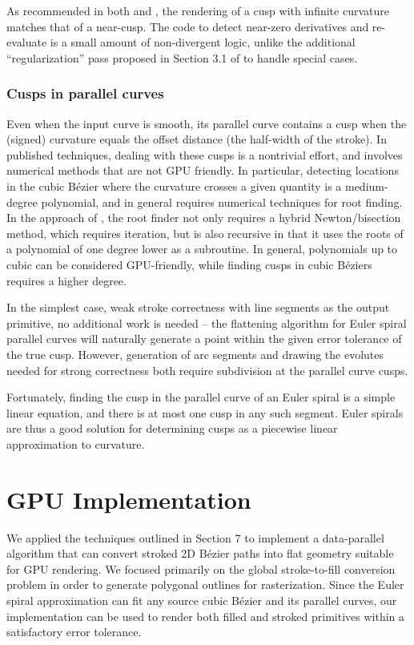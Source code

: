 \documentclass[sigconf, nonacm]{acmart}
\begin{document}
As recommended in both \citet{Nehab2020} and \citet{Kilgard2020}, the rendering of a cusp with infinite curvature matches that of a near-cusp. The code to detect near-zero derivatives and re-evaluate is a small amount of non-divergent logic, unlike the additional ``regularization'' pass proposed in Section 3.1 of \citet{Nehab2020} to handle special cases.

\subsubsection{Cusps in parallel curves}

Even when the input curve is smooth, its parallel curve contains a cusp when the (signed) curvature equals the offset distance (the half-width of the stroke). In published techniques, dealing with these cusps is a nontrivial effort, and involves numerical methods that are not GPU friendly. In particular, detecting locations in the cubic Bézier where the curvature crosses a given quantity is a medium-degree polynomial, and in general requires numerical techniques for root finding. In the approach of \citet{Nehab2020}, the root finder not only requires a hybrid Newton/bisection method, which requires iteration, but is also recursive in that it uses the roots of a polynomial of one degree lower as a subroutine. In general, polynomials up to cubic can be considered GPU-friendly, while finding cusps in cubic Béziers requires a higher degree.

In the simplest case, weak stroke correctness with line segments as the output primitive, no additional work is needed -- the flattening algorithm for Euler spiral parallel curves will naturally generate a point within the given error tolerance of the true cusp. However, generation of arc segments and drawing the evolutes needed for strong correctness both require subdivision at the parallel curve cusps.

Fortunately, finding the cusp in the parallel curve of an Euler spiral is a simple linear equation, and there is at most one cusp in any such segment. Euler spirals are thus a good solution for determining cusps as a piecewise linear approximation to curvature.

\section{GPU Implementation} \label{section:gpu-impl}

We applied the techniques outlined in Section 7 to implement a data-parallel algorithm that can convert stroked 2D Bézier paths into flat geometry suitable for GPU rendering. We focused primarily on the global stroke-to-fill conversion problem in order to generate polygonal outlines for rasterization. Since the Euler spiral approximation can fit any source cubic Bézier and its parallel curves, our implementation can be used to render both filled and stroked primitives within a satisfactory error tolerance.
\end{document}
